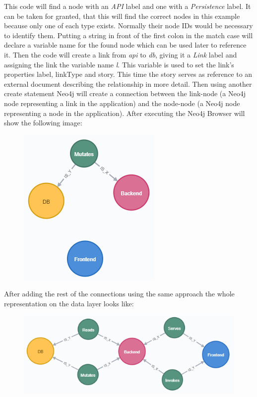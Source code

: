 This code will find a node with an \emph{API} label and one with a \emph{Persistence} label. It can be taken for granted, that this will find the correct nodes in this example because only one of each type exists. Normally their node IDs would be necessary to identify them. Putting a string in front of the first colon in the match case will declare a variable name for the found node which can be used later to reference it. Then the code will create a link from \emph{api} to \emph{db}, giving it a \emph{Link} label and assigning the link the variable name \emph{l}. This variable is used to set the link's properties label, linkType and story. This time the story serves as reference to an external document describing the relationship in more detail. Then using another create statement Neo4j will create a connection between the link-node (a Neo4j node representing a link in the application) and the node-node (a Neo4j node representing a node in the application). After executing the Neo4j Browser will show the following image:
\begin{figure}[H]
\centering
\includegraphics[scale=1]{Bilder/BasicGraphNeo2.png}
\label{ex423}
\end{figure}

\newpage
After adding the rest of the connections using the same approach the whole representation on the data layer looks like:
\begin{figure}[H]
\centering
\includegraphics[scale=1]{Bilder/BasicGraphNeo3.png}
\label{ex424}
\end{figure}

